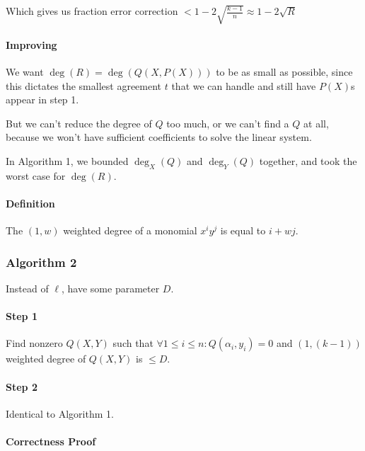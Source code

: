 \documentclass{idc_msc}
\begin{document}
Which gives us fraction error correction \(< 1 - 2 \sqrt{\frac{k-1}{n}} \approx 1 - 2\sqrt{R}\)

\paragraph{Improving}

We want \(\deg(R) = \deg(Q(X,P(X)))\) to be as small as possible, since this dictates the smallest agreement \(t\) that we can handle and still have \(P(X)\)s appear in step 1.

But we can't reduce the degree of \(Q\) too much, or we can't find a \(Q\) at all, because we won't have sufficient coefficients to solve the linear system.

In Algorithm 1, we bounded \(\deg_X(Q)\) and \(\deg_Y(Q)\) together, and took the worst case for \(\deg(R)\).

\paragraph{Definition}

The \((1,w)\) weighted degree of a monomial \(x^i y^j\) is equal to \(i + wj\).

\subsubsection{Algorithm 2}

Instead of \(\ell\), have some parameter \(D\).

\paragraph{Step 1}

Find nonzero \(Q(X,Y)\) such that \(\forall 1 \le i \le n : Q(\alpha_i, y_i) = 0\) and \((1,(k-1))\) weighted degree of \(Q(X,Y)\) is \(\le D\).

\paragraph{Step 2}

Identical to Algorithm 1.

\paragraph{Correctness Proof}
\end{document}
